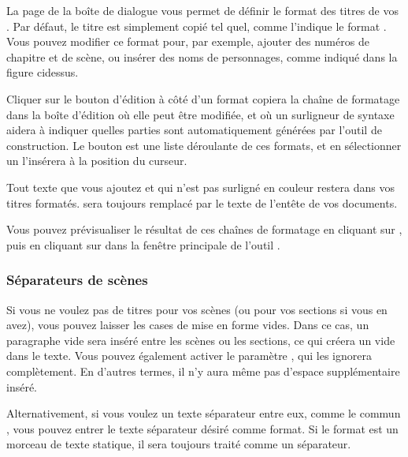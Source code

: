 \documentclass[a4paper,11pt,french]{sphinxmanual}
\begin{document}
\sphinxAtStartPar
La page  de la boîte de dialogue  vous permet de définir le format des titres de vos {\hyperref[\detokenize{int_glossary:term-Novel-Documents}]{}}. Par défaut, le titre est simplement copié tel quel, comme l’indique le format . Vous pouvez modifier ce format pour, par exemple, ajouter des numéros de chapitre et de scène, ou insérer des noms de personnages, comme indiqué dans la figure ci\sphinxhyphen{}dessus.

\sphinxAtStartPar
Cliquer sur le bouton d’édition à côté d’un format copiera la chaîne de formatage dans la boîte d’édition où elle peut être modifiée, et où un surligneur de syntaxe aidera à indiquer quelles parties sont automatiquement générées par l’outil de construction. Le bouton  est une liste déroulante de ces formats, et en sélectionner un l’insérera à la position du curseur.

\sphinxAtStartPar
Tout texte que vous ajoutez et qui n’est pas surligné en couleur restera dans vos titres formatés.  sera toujours remplacé par le texte de l’en\sphinxhyphen{}tête de vos documents.

\sphinxAtStartPar
Vous pouvez prévisualiser le résultat de ces chaînes de formatage en cliquant sur , puis en cliquant sur  dans la fenêtre principale de l’outil .


\subsubsection{Séparateurs de scènes}
\label{\detokenize{project_manuscript:scene-separators}}
\sphinxAtStartPar
Si vous ne voulez pas de titres pour vos scènes (ou pour vos sections si vous en avez), vous pouvez laisser les cases de mise en forme vides. Dans ce cas, un paragraphe vide sera inséré entre les scènes ou les sections, ce qui créera un vide dans le texte. Vous pouvez également activer le paramètre , qui les ignorera complètement. En d’autres termes, il n’y aura même pas d’espace supplémentaire inséré.

\sphinxAtStartPar
Alternativement, si vous voulez un texte séparateur entre eux, comme le commun \sphinxcode{\sphinxupquote{* * *}}, vous pouvez entrer le texte séparateur désiré comme format. Si le format est un morceau de texte statique, il sera toujours traité comme un séparateur.
\end{document}
